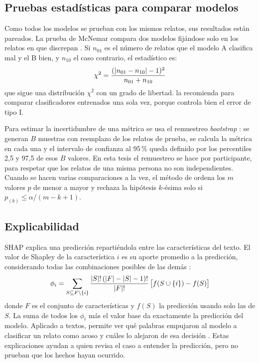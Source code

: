 \subsection{Pruebas estadísticas para comparar modelos}
Como todos los modelos se prueban con los mismos relatos, sus resultados están pareados. La prueba de McNemar compara dos modelos fijándose solo en los relatos en que discrepan \citep{mcnemar1947}. Si $n_{01}$ es el número de relatos que el modelo A clasifica mal y el B bien, y $n_{10}$ el caso contrario, el estadístico es:
\begin{equation}
\ecuacion{Estadístico de McNemar}
\chi^{2} = \frac{(|n_{01} - n_{10}| - 1)^{2}}{n_{01} + n_{10}}
\label{eq:mcnemar}
\end{equation}
que sigue una distribución $\chi^{2}$ con un grado de libertad. \citet{dietterich1998} la recomienda para comparar clasificadores entrenados una sola vez, porque controla bien el error de tipo I.

Para estimar la incertidumbre de una métrica se usa el remuestreo \textit{bootstrap} \citep{efron1993}: se generan $B$ muestras con reemplazo de los relatos de prueba, se calcula la métrica en cada una y el intervalo de confianza al 95\,\% queda definido por los percentiles 2,5 y 97,5 de esos $B$ valores. En esta tesis el remuestreo se hace por participante, para respetar que los relatos de una misma persona no son independientes. Cuando se hacen varias comparaciones a la vez, el método de \citet{holm1979} ordena los $m$ valores $p$ de menor a mayor y rechaza la hipótesis $k$-ésima solo si $p_{(k)} \leq \alpha/(m - k + 1)$.

\subsection{Explicabilidad}
SHAP explica una predicción repartiéndola entre las características del texto. El valor de Shapley de la característica $i$ es su aporte promedio a la predicción, considerando todas las combinaciones posibles de las demás \citep{lundberg2017}:
\begin{equation}
\ecuacion{Valor de Shapley de una característica}
\phi_i = \sum_{S \subseteq F \setminus \{i\}} \frac{|S|!\,(|F| - |S| - 1)!}{|F|!}\,\big[f(S \cup \{i\}) - f(S)\big]
\label{eq:shap}
\end{equation}
donde $F$ es el conjunto de características y $f(S)$ la predicción usando solo las de $S$. La suma de todos los $\phi_i$ más el valor base da exactamente la predicción del modelo. Aplicado a textos, permite ver qué palabras empujaron al modelo a clasificar un relato como acoso y cuáles lo alejaron de esa decisión \citep{mohammadi2024}. Estas explicaciones ayudan a quien revisa el caso a entender la predicción, pero no prueban que los hechos hayan ocurrido.

